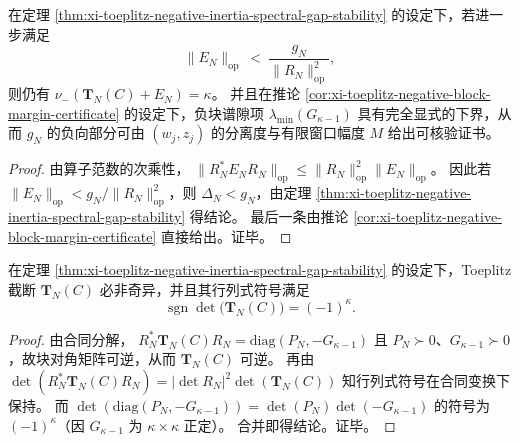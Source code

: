 \begin{corollary}[合同尺度下的可允许扰动半径]\label{cor:xi-toeplitz-negative-inertia-allowed-perturb-radius}
在定理 \ref{thm:xi-toeplitz-negative-inertia-spectral-gap-stability} 的设定下，若进一步满足
\[
\|E_N\|_{\mathrm{op}}\ <\ \frac{g_N}{\|R_N\|_{\mathrm{op}}^{2}},
\]
则仍有 \(\nu_-(\mathbf{T}_N(C)+E_N)=\kappa\)。
并且在推论 \ref{cor:xi-toeplitz-negative-block-margin-certificate} 的设定下，负块谱隙项 \(\lambda_{\min}(G_{\kappa-1})\) 具有完全显式的下界，从而 \(g_N\) 的负向部分可由 \((w_j,z_j)\) 的分离度与有限窗口幅度 \(M\) 给出可核验证书。
\end{corollary}
\begin{proof}
由算子范数的次乘性，
\(
\|R_N^{\ast}E_N R_N\|_{\mathrm{op}}\le \|R_N\|_{\mathrm{op}}^2\|E_N\|_{\mathrm{op}}
\)。
因此若 \(\|E_N\|_{\mathrm{op}}<g_N/\|R_N\|_{\mathrm{op}}^2\)，则 \(\Delta_N<g_N\)，由定理 \ref{thm:xi-toeplitz-negative-inertia-spectral-gap-stability} 得结论。
最后一条由推论 \ref{cor:xi-toeplitz-negative-block-margin-certificate} 直接给出。证毕。
\end{proof}

\begin{corollary}[稳定层级的非奇异性与行列式符号]\label{cor:xi-toeplitz-determinant-sign-rigidity}
在定理 \ref{thm:xi-toeplitz-negative-inertia-spectral-gap-stability} 的设定下，Toeplitz 截断 \(\mathbf{T}_N(C)\) 必非奇异，并且其行列式符号满足
\[
\boxed{\;
\operatorname{sgn}\det\!\bigl(\mathbf{T}_N(C)\bigr)=(-1)^{\kappa}. \;}
\]
\end{corollary}
\begin{proof}
由合同分解，
\(
R_N^{\ast}\mathbf{T}_N(C)R_N=\mathrm{diag}(P_N,-G_{\kappa-1})
\)
且 \(P_N\succ 0\)、\(G_{\kappa-1}\succ 0\)，故块对角矩阵可逆，从而 \(\mathbf{T}_N(C)\) 可逆。
再由
\(
\det(R_N^{\ast}\mathbf{T}_N(C)R_N)=|\det R_N|^2\det(\mathbf{T}_N(C))
\)
知行列式符号在合同变换下保持。
而
\(
\det(\mathrm{diag}(P_N,-G_{\kappa-1}))=\det(P_N)\det(-G_{\kappa-1})
\)
的符号为 \((-1)^{\kappa}\)（因 \(G_{\kappa-1}\) 为 \(\kappa\times\kappa\) 正定）。
合并即得结论。证毕。
\end{proof}


